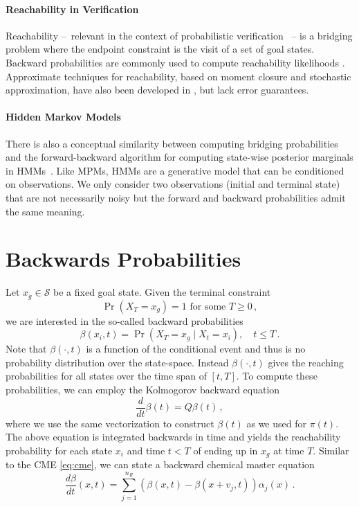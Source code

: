\paragraph{Reachability in Verification}
Reachability --~relevant in the context of probabilistic verification \cite{bortolussi2014stochastic,neupane2019stamina}~-- is a bridging problem where the endpoint constraint is the visit of a set of goal states.
Backward probabilities are commonly used to compute reachability likelihoods \cite{amparore2013backward,zapreev2006safe}.
Approximate techniques for reachability, based on moment closure and stochastic approximation, have also been developed in \cite{bortolussi2014stochastic,Bortolussi18infcomp}, but lack error guarantees. 

\paragraph{Hidden Markov Models}
There is also a conceptual similarity between computing bridging probabilities and the forward-backward algorithm for computing state-wise posterior marginals in \acfp{HMM}~\cite{rabiner1986introduction}. Like \acp{MPM}, \acp{HMM} are a generative model that can be conditioned on observations. We only consider two observations (initial and terminal state) that are not necessarily noisy but the forward and backward probabilities admit the same meaning.


\section{Backwards Probabilities}
Let $x_g\in \mathcal{S}$ be a fixed goal state.
Given the terminal constraint 
\begin{equation*}
	\Pr(X_T=x_g)=1 \text{ for some }T\geq 0\,,
\end{equation*}
we are interested in the so-called backward probabilities
\begin{equation}\label{eq:back_probs}
\beta(x_i, t) = \Pr(X_T=x_g\mid X_t = x_i),\quad t\leq T\,.
\end{equation}
Note that $\beta(\cdot, t)$ is a function of the conditional event and thus is no probability distribution over the state-space.
Instead $\beta(\cdot, t)$ gives the reaching probabilities for all states over the
time span of $[t, T]$.
To compute these probabilities, we can employ the Kolmogorov backward equation
\begin{equation}\label{eq:backward}
\frac{d}{dt}\beta(t) = Q\beta(t)\,,
\end{equation}
where we use the same vectorization to construct $\beta(t)$ as we used
for $\pi(t)$.
The above equation is integrated backwards in time and yields the reachability
probability for each state $x_i$ and time $t<T$ of ending up in $x_g$ at time $T$.
Similar to the CME \eqref{eq:cme}, we can state a backward chemical master equation
\begin{equation}\label{eq:bcme}
    \frac{d\beta}{dt}({x}, t) =
    \sum_{j=1}^{n_R}\left(
        \beta( x,t) - \beta( x+ v_j,t)
    \right)\alpha_j({x})\,.
\end{equation}

